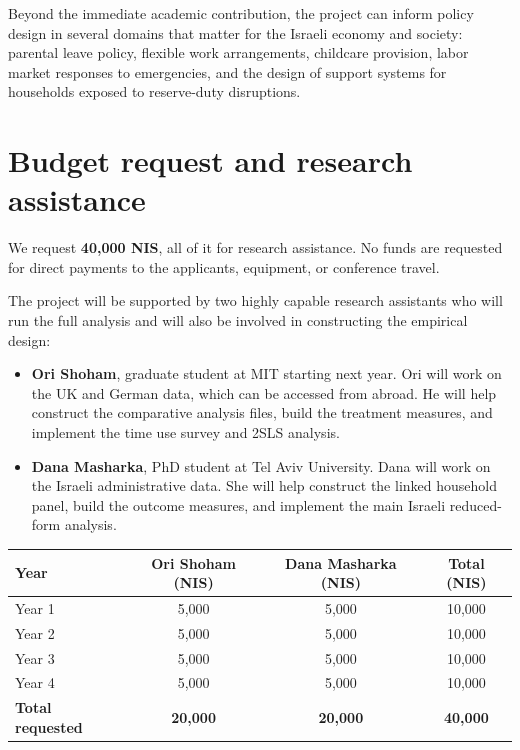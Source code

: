 \documentclass[12pt]{article}
\begin{document}
Beyond the immediate academic contribution, the project can inform policy design in several domains that matter for the Israeli economy and society: parental leave policy, flexible work arrangements, childcare provision, labor market responses to emergencies, and the design of support systems for households exposed to reserve-duty disruptions.

\section{Budget request and research assistance}

We request \textbf{40,000 NIS}, all of it for research assistance. No funds are requested for direct payments to the applicants, equipment, or conference travel.

The project will be supported by two highly capable research assistants who will run the full analysis and will also be involved in constructing the empirical design:
\begin{itemize}[leftmargin=1.2em]
    \item \textbf{Ori Shoham}, graduate student at MIT starting next year. Ori will work on the UK and German data, which can be accessed from abroad. He will help construct the comparative analysis files, build the treatment measures, and implement the time use survey and 2SLS analysis.
    \item \textbf{Dana Masharka}, PhD student at Tel Aviv University. Dana will work on the Israeli administrative data. She will help construct the linked household panel, build the outcome measures, and implement the main Israeli reduced-form analysis.
\end{itemize}

\begin{center}
\begin{tabularx}{0.95\textwidth}{>{\raggedright\arraybackslash}X c c c}
\toprule
\textbf{Year} & \textbf{Ori Shoham (NIS)} & \textbf{Dana Masharka (NIS)} & \textbf{Total (NIS)} \\
\midrule
Year 1 & 5,000 & 5,000 & 10,000 \\
Year 2 & 5,000 & 5,000 & 10,000 \\
Year 3 & 5,000 & 5,000 & 10,000 \\
Year 4 & 5,000 & 5,000 & 10,000 \\
\midrule
\textbf{Total requested} & \textbf{20,000} & \textbf{20,000} & \textbf{40,000} \\
\bottomrule
\end{tabularx}
\end{center}
\end{document}
